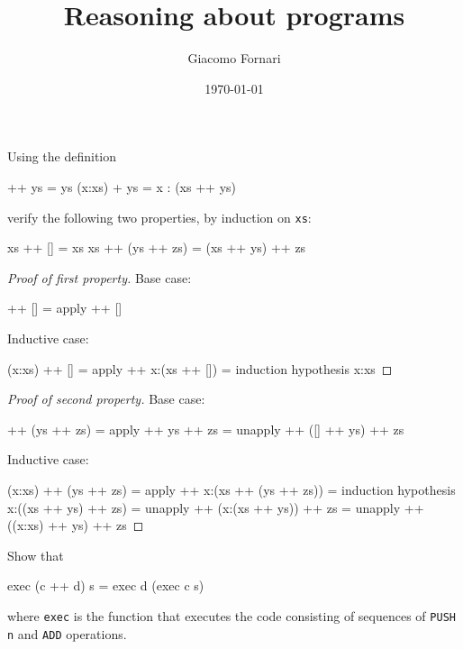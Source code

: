 \documentclass[12pt]{article}
\title{Reasoning about programs}
\author{Giacomo Fornari}
\date{\today}
\newenvironment{code}{\endgraf\verbatim}{\endverbatim}
\newenvironment{problem}[2][Problem]{\begin{trivlist}
\item[\hskip \labelsep {\bfseries #1}\hskip \labelsep {\bfseries #2.}]}{\end{trivlist}}
\begin{document}
\maketitle


\begin{problem}{1}
Using the definition

\begin{code}
[] ++ ys = ys
(x:xs) + ys = x : (xs ++ ys)
\end{code}

verify the following two properties, by induction on \verb|xs|:

\begin{code}
xs ++ [] = xs
xs ++ (ys ++ zs) = (xs ++ ys) ++ zs
\end{code}
\end{problem}


\begin{proof}[Proof of first property]
Base case:

\begin{code}
  [] ++ []
=   { apply ++ }
  []
\end{code}

Inductive case:

\begin{code}
  (x:xs) ++ []
=   { apply ++ }
  x:(xs ++ [])
=   { induction hypothesis }
  x:xs
\end{code}
\end{proof}


\begin{proof}[Proof of second property]
Base case:

\begin{code}
  [] ++ (ys ++ zs)
=   { apply ++ }
  ys ++ zs
=   { unapply ++ }
  ([] ++ ys) ++ zs
\end{code}

Inductive case:

\begin{code}
  (x:xs) ++ (ys ++ zs)
=   { apply ++ }
  x:(xs ++ (ys ++ zs))
=   { induction hypothesis }
  x:((xs ++ ys) ++ zs)
=   { unapply ++ }
  (x:(xs ++ ys)) ++ zs
=   { unapply ++ }
  ((x:xs) ++ ys) ++ zs
\end{code}
\end{proof}


\begin{problem}{2}
Show that

\begin{code}
exec (c ++ d) s = exec d (exec c s)
\end{code}

where \verb|exec| is the function that executes the code consisting of sequences of \verb|PUSH n| and \verb|ADD| operations.
\end{problem}
\end{document}
